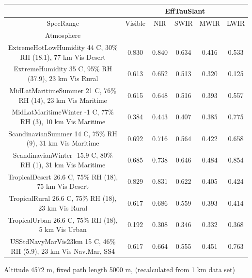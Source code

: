 \documentclass{workpackage}
\begin{document}
\begin{center}

\begin{footnotesize}

\begin{tabular}{|c|c|c|c|c|c|}
\hline
&\multicolumn{5}{|c|}{EffTauSlant}\\\hline
SpecRange&Visible&NIR&SWIR&MWIR&LWIR\\\hline
Atmosphere&&&&&\\\hline
ExtremeHotLowHumidity 44 C, 30\% RH (18.1), 77 km Vis Desert&0.830&0.840&0.634&0.416&0.533\\\hline
ExtremeHumidity 35 C, 95\% RH (37.9), 23 km Vis Rural&0.613&0.652&0.513&0.320&0.125\\\hline
MidLatMaritimeSummer 21 C, 76\% RH (14), 23 km Vis Maritime&0.615&0.648&0.516&0.393&0.557\\\hline
MidLatMaritimeWinter -1 C, 77\% RH (3), 10 km Vis Maritime&0.384&0.443&0.407&0.385&0.775\\\hline
ScandinavianSummer 14 C, 75\% RH (9), 31 km Vis Maritime&0.692&0.716&0.564&0.422&0.658\\\hline
ScandinavianWinter -15.9 C, 80\% RH (1), 31 km Vis Maritime&0.685&0.738&0.646&0.484&0.854\\\hline
TropicalDesert 26.6 C, 75\% RH (18), 75 km Vis Desert&0.829&0.831&0.622&0.405&0.424\\\hline
TropicalRural 26.6 C, 75\% RH (18), 23 km Vis Rural&0.617&0.686&0.559&0.393&0.414\\\hline
TropicalUrban 26.6 C, 75\% RH (18), 5 km Vis Urban&0.192&0.308&0.346&0.332&0.368\\\hline
USStdNavyMarVis23km 15 C, 46\% RH (5.9), 23 km Vis Nav.Mar, SS4&0.617&0.664&0.555&0.451&0.763\\\hline

\end{tabular}
\end{footnotesize}
\end{center}

Altitude 4572 m, fixed path length 5000 m, (recalculated from 1 km data set)
\end{document}
